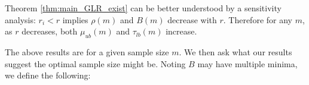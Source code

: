 { 
\iffalse
\begin{remark}
\label{remark:mopt}
Assume $N > 4$ and define
\begin{align}
    m_{opt} = \min \argmin_{m \in [1,N] \cap \mathbb{Z}} B(m).
\end{align}

    If (\ref{eq:GLR_exist_thm_B_constraint}) in Theorem \ref{thm:main_GLR_exist} holds for some $m \in [1,N]$
    then 
    \begin{itemize}
        \item Condition (\ref{eq:GLR_exist_thm_B_constraint}) holds at a sample size of $m_{opt}$ .
        \item $\mu_{ub}(m)$ and $\tau_{lb}(\mu,m)$ are both maximised at $m=m_{opt}$.
        \item The MSE upper bound in Corollary \ref{corr:unif_ub_xi_1_MSE} is minimised at a sample size of $m_{opt}$.
        \item $m_{opt} \in \left[\left\lfloor\sqrt{N}\right\rfloor, \left\lceil\sqrt{rN}\right\rceil \right]$ and $m_{opt} \leq \frac{N}{2}$.
    \end{itemize}
\end{remark}
\begin{proof}
    See Appendix \ref{app:proof_of_remark_GLR_mopt}.
\end{proof}
\fi




\iffalse
Theorem \ref{thm:main_GLR_exist} can be better understood by a sensitivity analysis: $r_{i} < r$ implies $\rho(m)$ and $B(m)$ decrease with $r$.
Therefore for any $m$, as $r$ decreases, both $\mu_{ub}(m)$ and $\tau_{lb}(m)$ increase.
    

The above results are for a given sample size $m$. We then ask what our results suggest the optimal sample size might be. Noting $B$ may have multiple minima, %
we define the following:

}
